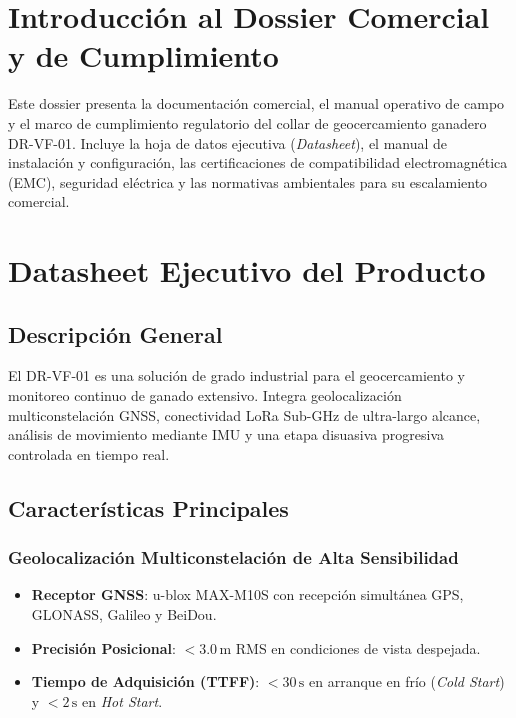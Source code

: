 \section{Introducción al Dossier Comercial y de Cumplimiento}

Este dossier presenta la documentación comercial, el manual operativo de campo y el marco de cumplimiento regulatorio del collar de geocercamiento ganadero DR-VF-01. Incluye la hoja de datos ejecutiva (\textit{Datasheet}), el manual de instalación y configuración, las certificaciones de compatibilidad electromagnética (EMC), seguridad eléctrica y las normativas ambientales para su escalamiento comercial.

\section{Datasheet Ejecutivo del Producto}

\subsection{Descripción General}

El DR-VF-01 es una solución de grado industrial para el geocercamiento y monitoreo continuo de ganado extensivo. Integra geolocalización multiconstelación GNSS, conectividad LoRa Sub-GHz de ultra-largo alcance, análisis de movimiento mediante IMU y una etapa disuasiva progresiva controlada en tiempo real.

\subsection{Características Principales}

\subsubsection{Geolocalización Multiconstelación de Alta Sensibilidad}

\begin{itemize}[leftmargin=*]
    \item \textbf{Receptor GNSS}: u-blox MAX-M10S con recepción simultánea GPS, GLONASS, Galileo y BeiDou.
    \item \textbf{Precisión Posicional}: $< 3.0\,\text{m}$ RMS en condiciones de vista despejada.
    \item \textbf{Tiempo de Adquisición (TTFF)}: $< 30\,\text{s}$ en arranque en frío (\textit{Cold Start}) y $< 2\,\text{s}$ en \textit{Hot Start}.
\end{itemize}

